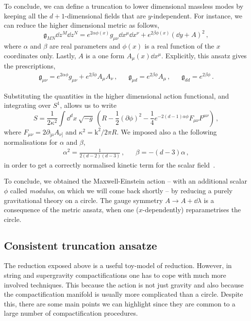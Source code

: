 \documentclass[debug]{phd}
\begin{document}
			To conclude, we can define a truncation to lower dimensional massless modes by keeping all the $d+1$-dimensional fields that are $y$-independent.
			For instance, we can reduce the higher dimensional metric as follows,
					\begin{equation*}
						\mathfrak{g}_{MN} \dd z^M \dd z^N = e^{2\alpha \phi(x)} g_{\mu\nu} \dd x^\mu \dd x^\nu + e^{2\beta \phi(x)} (\dd y + A )^2\, ,
					\end{equation*}
			where $\alpha$ and $\beta$ are real parameters and $\phi(x)$ is a real function of the $x$ coordinates only. 
			Lastly, $A$ is a one form $A_{\mu}(x) \dd x^\mu$.
			Explicitly, this ansatz gives the prescriptions,
					\begin{align*}
						&& \mathfrak{g}_{\mu\nu} = e^{2\alpha \phi} g_{\mu\nu} + e^{2\beta \phi} A_{\mu} A_{\nu} \, , && \mathfrak{g}_{\mu d} = e^{2\beta \phi} A_{\mu} \, , & & \mathfrak{g}_{dd} = e^{2\beta\phi} \, . & &
					\end{align*}
			
			Substituting the quantities in the higher dimensional action functional, and integrating over $S^1$, allows us to write
					\begin{equation*}
						S = \frac{1}{2 \kappa^2} \int \dd^{d}x\ \sqrt{-g}\ \left(R - \frac{1}{2} (\partial \phi)^2 - \frac{1}{4} e^{-2(d-1) \alpha \phi} F_{\mu\nu}F^{\mu\nu} \right)\, ,
					\end{equation*}
			where $F_{\mu\nu} = 2 \partial_{[\mu} A_{\nu]}$ and $\kappa^2 = \mathrm{k}^2/ 2\pi R$.
			We imposed also a the following normalisations for $\alpha$ and $\beta$,
					\begin{align*}
						&& \alpha^2 = \frac{1}{2(d-2)(d-3)} \, , & & \beta = - (d-3) \alpha \, ,& &
					\end{align*}
			in order to get a correctly normalised kinetic term for the scalar field~\cite{popeKK}.
			
			To conclude, we obtained the Maxwell-Einstein action -- with an additional scalar $\phi$ called \emph{modulus}, on which we will come back shortly -- by reducing a purely gravitational theory on a circle.
			The gauge symmetry $A \rightarrow A + \dd \lambda$ is a consequence of the metric ansatz, when one ($x$-dependently) reparametrises the circle.
			\subsection{Consistent truncation ansatze}
				The reduction exposed above is a useful toy-model of reduction.
				However, in string and supergravity compactifications one has to cope with much more involved techniques.
				This because the action is not just gravity and also because the compactification manifold is usually more complicated than a circle.
				Despite this, there are some main points we can highlight since they are common to a large number of compactification procedures.
			
\end{document}
